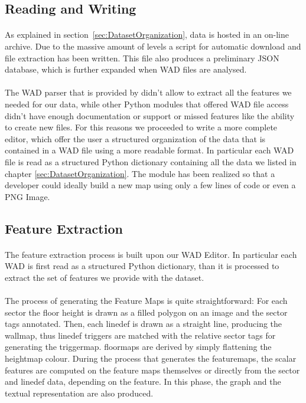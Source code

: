 \subsection{Reading and Writing}
\paragraph{} As explained in  section~\ref{sec:DatasetOrganization}, data is hosted in an on-line archive. Due to the massive amount of levels a script for automatic download and file extraction has been written. This file also produces a preliminary JSON database, which is further expanded when WAD files are analysed.
\paragraph{} The WAD parser that is provided by  didn't allow to extract all the features we needed for our data, while other Python modules that offered WAD file access didn't have enough documentation or support or missed features like the ability to create new files. For this reasons we proceeded to write a more complete editor, which offer the user a structured organization of the data that is contained in a WAD file using a more readable format. In particular each WAD file is read as a structured Python dictionary containing all the data we listed in chapter \ref{sec:DatasetOrganization}. The module has been realized so that a developer could ideally build a new map using only a few lines of code or even a PNG Image.


\subsection{Feature Extraction}
\paragraph{} The feature extraction process is built upon our WAD Editor. In particular each WAD is first read as a structured Python dictionary, than it is processed to extract the set of features we provide with the dataset.
\paragraph{} The process of generating the Feature Maps is quite straightforward: For each \gls{sector} the floor height is drawn as a filled polygon on an image and the sector tags annotated. Then, each linedef is drawn as a straight line, producing the \gls{wallmap}, thus linedef triggers are matched with the relative sector tags for generating the \gls{triggermap}. \glspl{floormap} are derived by simply flattening the heightmap colour. During the process that generates the \glspl{featuremap}, the scalar features are computed on the feature maps themselves or directly from the sector and linedef data, depending on the feature. In this phase, the graph and the textual representation are also produced. 
